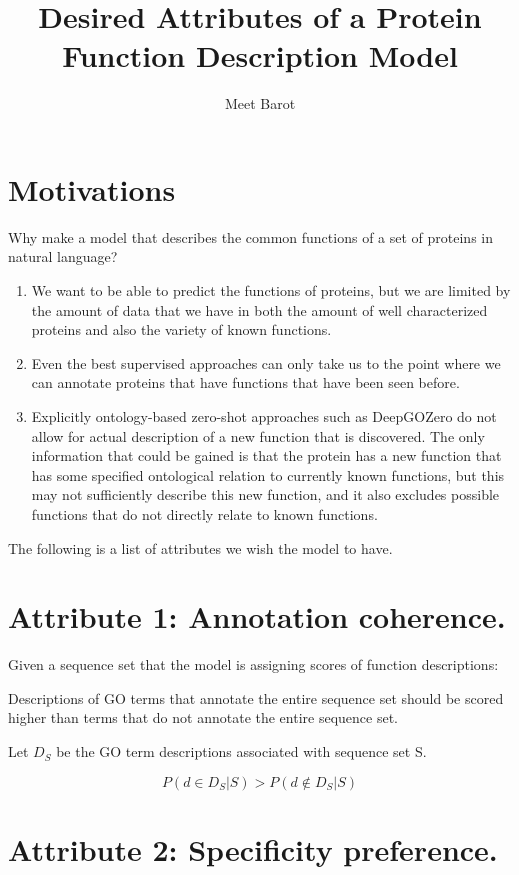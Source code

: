 \documentclass{specification}
\title{Desired Attributes of a Protein Function Description Model}
\author{Meet Barot}
\begin{document}
\maketitle

\section*{Motivations}
Why make a model that describes the common functions of a set of proteins in natural language?
\begin{enumerate}
    \item We want to be able to predict the functions of proteins, but we are limited by the amount of data that we have in both the amount of well characterized proteins and also the variety of known functions.
    \item Even the best supervised approaches can only take us to the point where we can annotate proteins that have functions that have been seen before.
    \item Explicitly ontology-based zero-shot approaches such as DeepGOZero \cite{DeepGOZero} do not allow for actual description of a new function that is discovered. The only information that could be gained is that the protein has a new function that has some specified ontological relation to currently known functions, but this may not sufficiently describe this new function, and it also excludes possible functions that do not directly relate to known functions.
\end{enumerate}

The following is a list of attributes we wish the model to have.

\section*{Attribute 1: Annotation coherence.}

Given a sequence set that the model is assigning scores of function descriptions:

Descriptions of GO terms that annotate the entire sequence set should be scored higher than terms that do not annotate the entire sequence set.

Let $D_{S}$ be the GO term descriptions associated with sequence set S.

\[P(d \in D_{S} | S) > P(d \notin D_{S} | S)\]


\section*{Attribute 2: Specificity preference.}
\end{document}
